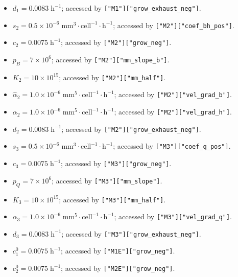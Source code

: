 \documentclass[reqno]{amsart}
\theoremstyle{definition}
\theoremstyle{remark}
\numberwithin{equation}{section}
\numberwithin{figure}{section}
\begin{document}
\begin{itemize}
  \item {\color{cyan}$d_1=0.0083\;\textrm{h}^{-1}$}; accessed by {\color{green}\texttt{["M1"]["grow\_exhaust\_neg"]}}.
  \item {\color{cyan}$s_2=0.5\times10^{-6}\;\textrm{mm}^3\cdot\textrm{cell}^{-1}\cdot\textrm{h}^{-1}$}; accessed by {\color{green}\texttt{["M2"]["coef\_bh\_pos"]}}.
  \item {\color{cyan}$c_2=0.0075\;\textrm{h}^{-1}$}; accessed by {\color{green}\texttt{["M2"]["grow\_neg"]}}.
  \item {\color{cyan}$p_B=7\times10^6$}; accessed by {\color{green}\texttt{["M2"]["mm\_slope\_b"]}}.
  \item {\color{cyan}$K_2=10\times10^{15}$}; accessed by {\color{green}\texttt{["M2"]["mm\_half"]}}.
  \item {\color{cyan}$\hat{\alpha}_2=1.0\times10^{-6}\;\textrm{mm}^5\cdot\textrm{cell}^{-1}\cdot\textrm{h}^{-1}$}; accessed by {\color{green}\texttt{["M2"]["vel\_grad\_b"]}}.
  \item {\color{cyan}$\alpha_2=1.0\times10^{-6}\;\textrm{mm}^5\cdot\textrm{cell}^{-1}\cdot\textrm{h}^{-1}$}; accessed by {\color{green}\texttt{["M2"]["vel\_grad\_h"]}}.
  \item {\color{cyan}$d_2=0.0083\;\textrm{h}^{-1}$}; accessed by {\color{green}\texttt{["M2"]["grow\_exhaust\_neg"]}}.
  \item {\color{cyan}$s_3=0.5\times10^{-6}\;\textrm{mm}^3\cdot\textrm{cell}^{-1}\cdot\textrm{h}^{-1}$}; accessed by {\color{green}\texttt{["M3"]["coef\_q\_pos"]}}.
  \item {\color{cyan}$c_3=0.0075\;\textrm{h}^{-1}$}; accessed by {\color{green}\texttt{["M3"]["grow\_neg"]}}.
  \item {\color{cyan}$p_Q=7\times10^6$}; accessed by {\color{green}\texttt{["M3"]["mm\_slope"]}}.
  \item {\color{cyan}$K_3=10\times10^{15}$}; accessed by {\color{green}\texttt{["M3"]["mm\_half"]}}.
  \item {\color{cyan}$\alpha_3=1.0\times10^{-6}\;\textrm{mm}^5\cdot\textrm{cell}^{-1}\cdot\textrm{h}^{-1}$}; accessed by {\color{green}\texttt{["M3"]["vel\_grad\_q"]}}.
  \item {\color{cyan}$d_3=0.0083\;\textrm{h}^{-1}$}; accessed by {\color{green}\texttt{["M3"]["grow\_exhaust\_neg"]}}.
  \item {\color{cyan}$c_1^0=0.0075\;\textrm{h}^{-1}$}; accessed by {\color{green}\texttt{["M1E"]["grow\_neg"]}}.
  \item {\color{cyan}$c_2^0=0.0075\;\textrm{h}^{-1}$}; accessed by {\color{green}\texttt{["M2E"]["grow\_neg"]}}.

\end{itemize}
\end{document}
